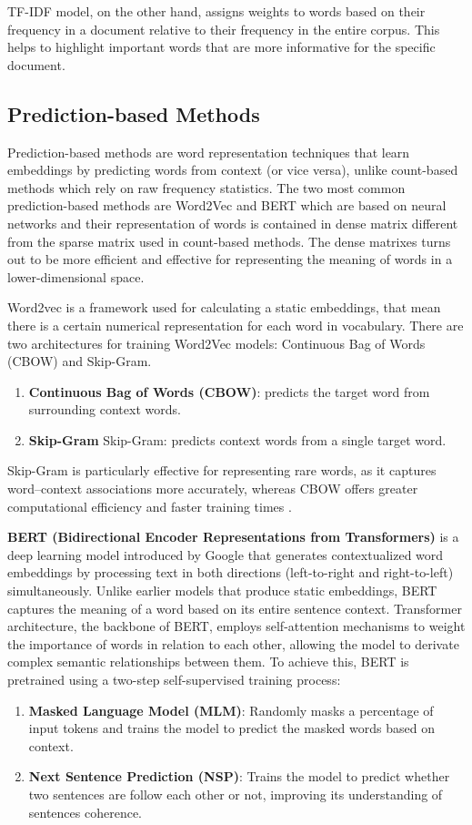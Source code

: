 \documentclass{SGGW-thesis-EN}
\begin{document}
TF-IDF model, on the other hand, assigns weights to words based on their frequency in a document relative to their frequency in the entire corpus. 
This helps to highlight important words that are more informative for the specific document.

\subsection{Prediction-based Methods}
Prediction-based methods are word representation techniques that learn embeddings by predicting words from context (or vice versa), unlike count-based methods which rely on raw frequency statistics.
The two most common prediction-based methods are Word2Vec and BERT which are based on neural networks and their representation of words is contained in dense matrix different from the sparse matrix used in count-based methods.
The dense matrixes turns out to be more efficient and effective for representing the meaning of words in a lower-dimensional space.\cite{jurafsky2023slp3}

Word2vec is a framework used for calculating a static embeddings, that mean there is a certain numerical representation for each word in vocabulary.
There are two architectures for training Word2Vec models: Continuous Bag of Words (CBOW) and Skip-Gram.
\begin{enumerate}
  \item \textbf{Continuous Bag of Words (CBOW)}: predicts the target word from surrounding context words.
  \item \textbf{Skip-Gram} Skip-Gram: predicts context words from a single target word.
\end{enumerate}
Skip-Gram is particularly effective for representing rare words, as it captures word–context associations more accurately,
whereas CBOW offers greater computational efficiency and faster training times \cite{mikolov2013distributed}.

\textbf{BERT (Bidirectional Encoder Representations from Transformers)} is a deep learning model introduced by Google that generates contextualized word embeddings by processing text in both directions (left-to-right and right-to-left) simultaneously. 
Unlike earlier models that produce static embeddings, BERT captures the meaning of a word based on its entire sentence context. 
Transformer architecture, the backbone of BERT, employs self-attention mechanisms to weight the importance of words in relation to each other, allowing the model to derivate complex semantic relationships between them.
To achieve this, BERT is pretrained using a two-step self-supervised training process:
\begin{enumerate}
  \item \textbf{Masked Language Model (MLM)}: Randomly masks a percentage of input tokens and trains the model to predict the masked words based on context.
  \item \textbf{Next Sentence Prediction (NSP)}: Trains the model to predict whether two sentences are follow each other or not, improving its understanding of sentences coherence.
\end{enumerate}
\end{document}
